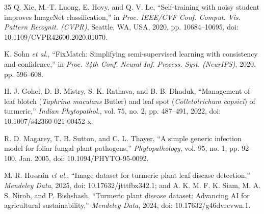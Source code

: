 \documentclass[journal]{IEEEtran}
\begin{document}
\begin{thebibliography}{35}
Q. Xie, M.-T. Luong, E. Hovy, and Q. V. Le, ``Self-training with noisy student
improves ImageNet classification,'' in \emph{Proc. IEEE/CVF Conf. Comput. Vis.
Pattern Recognit. (CVPR)}, Seattle, WA, USA, 2020, pp. 10684--10695,
doi: 10.1109/CVPR42600.2020.01070.

K. Sohn \emph{et al.}, ``FixMatch: Simplifying semi-supervised learning with
consistency and confidence,'' in \emph{Proc. 34th Conf. Neural Inf. Process. Syst.
(NeurIPS)}, 2020, pp. 596--608.

H. J. Gohel, D. B. Mistry, S. K. Rathava, and B. B. Dhaduk, ``Management of leaf
blotch (\textit{Taphrina maculans} Butler) and leaf spot (\textit{Colletotrichum
capsici}) of turmeric,'' \emph{Indian Phytopathol.}, vol. 75, no. 2, pp. 487--491,
2022, doi: 10.1007/s42360-021-00452-x.

R. D. Magarey, T. B. Sutton, and C. L. Thayer, ``A simple generic infection model
for foliar fungal plant pathogens,'' \emph{Phytopathology}, vol. 95, no. 1,
pp. 92--100, Jan. 2005, doi: 10.1094/PHYTO-95-0092.

M. R. Hossain \emph{et al.}, ``Image dataset for turmeric plant leaf disease
detection,'' \emph{Mendeley Data}, 2025, doi: 10.17632/jtttfbx342.1; and
A. K. M. F. K. Siam, M. A. S. Nirob, and P. Bishshash, ``Turmeric plant disease
dataset: Advancing AI for agricultural sustainability,'' \emph{Mendeley Data}, 2024,
doi: 10.17632/g46dvrcvwn.1.

\end{thebibliography}

\end{document}
